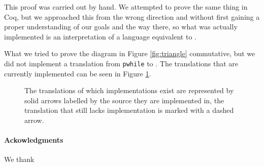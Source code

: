 \documentclass[11pt, leqno, titlepage]{article}
\theoremstyle{definition}
\begin{document}
This proof was carried out by hand. We attempted to prove the same thing in Coq, but
we approached this from the wrong direction and without first gaining a proper
understanding of our goals and the way there, so what was actually implemented is an
interpretation of a language equivalent to \rml.

What we tried to prove the diagram in Figure \ref{fig:triangle} commutative, but we
did not implement a translation from \texttt{pwhile} to \rml. The translations that
are currently implemented can be seen in Figure \ref{fig:triangle-ours}. 
\begin{figure}
  \centering
  \caption{The translations of which implementations exist are represented by solid
    arrows labelled by the source they are implemented in, the translation that still
    lacks implementation is marked with a dashed arrow. }
  \label{fig:triangle-ours}
\end{figure}


\paragraph{Ackowledgments}We thank

\newpage


\end{document}
